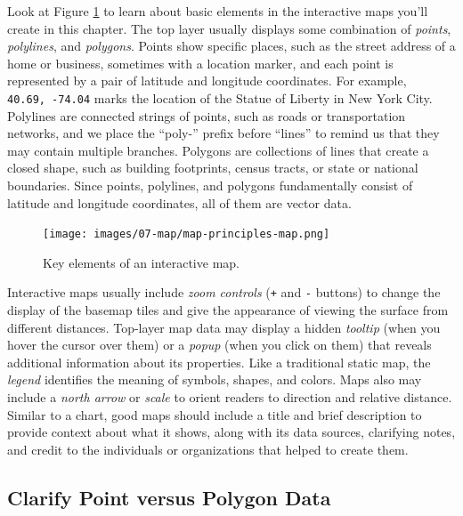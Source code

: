 \documentclass[
  english,
]{book}
\begin{document}
Look at Figure \ref{fig:map-principles-map} to learn about basic elements in the interactive maps you'll create in this chapter. The top layer usually displays some combination of \emph{points}, \emph{polylines}, and \emph{polygons}. Points show specific places, such as the street address of a home or business, sometimes with a location marker, and each point is represented by a pair of latitude and longitude coordinates. For example, \texttt{40.69,\ -74.04} marks the location of the Statue of Liberty in New York City. Polylines are connected strings of points, such as roads or transportation networks, and we place the ``poly-'' prefix before ``lines'' to remind us that they may contain multiple branches. Polygons are collections of lines that create a closed shape, such as building footprints, census tracts, or state or national boundaries. Since points, polylines, and polygons fundamentally consist of latitude and longitude coordinates, all of them are vector data.



\begin{figure}
\centering
\texttt{[image: images/07-map/map-principles-map.png]}
\caption{\label{fig:map-principles-map}Key elements of an interactive map.}
\end{figure}

Interactive maps usually include \emph{zoom controls} (\texttt{+} and \texttt{-} buttons) to change the display of the basemap tiles and give the appearance of viewing the surface from different distances. Top-layer map data may display a hidden \emph{tooltip} (when you hover the cursor over them) or a \emph{popup} (when you click on them) that reveals additional information about its properties. Like a traditional static map, the \emph{legend} identifies the meaning of symbols, shapes, and colors. Maps also may include a \emph{north arrow} or \emph{scale} to orient readers to direction and relative distance. Similar to a chart, good maps should include a title and brief description to provide context about what it shows, along with its data sources, clarifying notes, and credit to the individuals or organizations that helped to create them.

\hypertarget{clarify-point-versus-polygon-data}{%
\subsection*{Clarify Point versus Polygon Data}\label{clarify-point-versus-polygon-data}}
\end{document}
